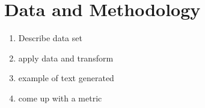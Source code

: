 \section{Data and Methodology }
\begin{enumerate}
	\item Describe data set 
	\item apply data and transform 
	\item example of text generated 
	\item come up with a metric
\end{enumerate}
